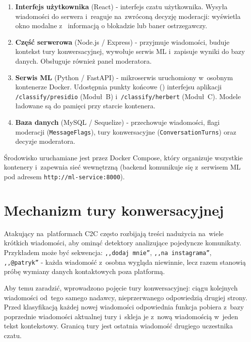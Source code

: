 \begin{enumerate}
  \item \textbf{Interfejs użytkownika} (React) - interfejs czatu użytkownika.
    Wysyła wiadomości do serwera i~reaguje na~zwróconą decyzję
    moderacji: wyświetla okno modalne z~ informacją o blokadzie lub baner ostrzegawczy.

  \item \textbf{Część serwerowa} (Node.js / Express) - przyjmuje wiadomości,
    buduje kontekst tury konwersacyjnej, wywołuje serwis ML i~zapisuje
    wyniki do bazy danych. Obsługuje również panel moderatora.

  \item \textbf{Serwis ML} (Python / FastAPI) - mikroserwis uruchomiony
    w~osobnym kontenerze Docker. Udostępnia punkty końcowe ()
    interfejsu aplikacji \texttt{/classify/presidio} (Moduł~B) i~\texttt{/classify/herbert}
    (Moduł~C). Modele ładowane są do pamięci przy starcie kontenera.

  \item \textbf{Baza danych} (MySQL / Sequelize) - przechowuje wiadomości,
    flagi moderacji (\texttt{MessageFlags}), tury konwersacyjne
    (\texttt{ConversationTurns}) oraz decyzje moderatora.
\end{enumerate}

Środowisko uruchamiane jest przez Docker Compose, który organizuje
wszystkie kontenery i~zapewnia sieć wewnętrzną (backend komunikuje
się z~serwisem ML pod adresem \texttt{http://ml-service:8000}).

\section{Mechanizm tury konwersacyjnej}
\label{sec:tura}

Atakujący na~platformach C2C często rozbijają treści nadużycia
na~wiele krótkich wiadomości, aby ominąć detektory analizujące
pojedyncze komunikaty. Przykładem może być sekwencja:
\texttt{,,dodaj mnie''}, \texttt{,,na instagrama''}, \texttt{,,@patryk''}
- każda wiadomość z~osobna wygląda niewinnie, lecz razem stanowią
próbę wymiany danych kontaktowych poza platformą.

Aby temu zaradzić, wprowadzono pojęcie tury konwersacyjnej:
ciągu kolejnych wiadomości od~tego samego nadawcy, nieprzerwanego
odpowiedzią drugiej strony. Przed klasyfikacją każdej nowej wiadomości odpowiednia
funkcja pobiera z~bazy poprzednie wiadomości
aktualnej tury i~skleja je z~nową wiadomością w~jeden tekst kontekstowy. Granicą tury jest ostatnia wiadomość drugiego
uczestnika czatu.

